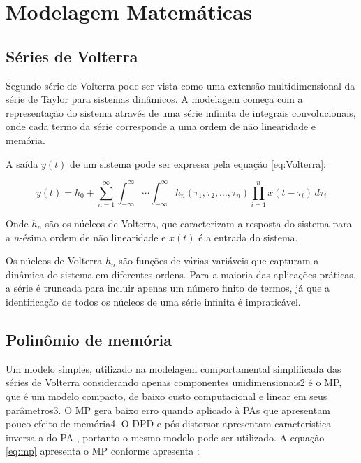 \section{Modelagem Matemáticas}

\subsection*{Séries de Volterra}
Segundo \cite{Gonçalves2009} série de Volterra pode ser vista como uma extensão multidimensional da série de Taylor para sistemas dinâmicos. A modelagem começa com a representação do sistema através de uma série infinita de integrais convolucionais, onde cada termo da série corresponde a uma ordem de não linearidade e memória.

A saída \( y(t) \) de um sistema pode ser expressa pela equação \ref{eq:Volterra}:

\begin{equation}
    y(t) = h_0 + \sum_{n=1}^{\infty} \int_{-\infty}^{\infty} \cdots \int_{-\infty}^{\infty} h_n(\tau_1, \tau_2, \ldots, \tau_n) \prod_{i=1}^{n} x(t - \tau_i) \, d\tau_i
    \label{eq:Volterra}
\end{equation}

Onde \( h_n \) são os núcleos de Volterra, que caracterizam a resposta do sistema para a \( n \)-ésima ordem de não linearidade e \( x(t) \) é a entrada do sistema.

Os núcleos de Volterra \( h_n \) são funções de várias variáveis que capturam a dinâmica do sistema em diferentes ordens. Para a maioria das aplicações práticas, a série é truncada para incluir apenas um número finito de termos, já que a identificação de todos os núcleos de uma série infinita é impraticável.

\subsection*{Polinômio de memória}\label{sub:polimem}

Um modelo simples, utilizado na modelagem comportamental simpliﬁcada das séries de Volterra considerando apenas componentes unidimensionais2 é o MP, que é um modelo compacto, de baixo custo computacional e linear em
seus parâmetros3. O MP gera baixo erro quando aplicado à PAs que apresentam pouco efeito de memória4. O DPD e pós distorsor apresentam característica inversa a do PA \cite{Schuartz2017}, portanto o mesmo modelo pode ser utilizado. A equação \ref{eq:mp} apresenta o MP conforme apresenta \cite{Schuartz2017}: 

